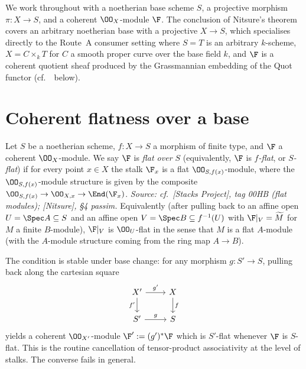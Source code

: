 We work throughout with a noetherian base scheme \(S\), a projective morphism
\(\pi : X \to S\), and a coherent \(\OO_X\)-module \(\F\). The conclusion of Nitsure's
theorem covers an arbitrary noetherian base with a projective \(X \to S\), which
specialises directly to the Route~A consumer setting where \(S = T\) is an arbitrary
\(k\)-scheme, \(X = C \times_k T\) for \(C\) a smooth proper curve over the base field
\(k\), and \(\F\) is a coherent quotient sheaf produced by the Grassmannian embedding
of the Quot functor (cf.\ \ below).

\section{Coherent flatness over a base}
\label{sec:coh_flat}

\begin{definition}

  \label{def:coherent_sheaf_flat}
  Let \(S\) be a noetherian scheme, \(f : X \to S\) a morphism of finite type, and
  \(\F\) a coherent \(\OO_X\)-module.  We say \(\F\) is \emph{flat over \(S\)}
  (equivalently, \(\F\) is \emph{\(f\)-flat}, or \emph{\(S\)-flat}) if for every
  point \(x \in X\) the stalk \(\F_x\) is a flat \(\OO_{S, f(x)}\)-module, where the
  \(\OO_{S, f(x)}\)-module structure is given by the composite
  \(\OO_{S, f(x)} \to \OO_{X, x} \to \End(\F_x)\).
  \textit{Source: cf.\ [Stacks Project], tag 00HB (flat modules); [Nitsure], \S4
  passim.}
  Equivalently (after pulling back to an affine open \(U = \Spec A \subseteq S\) and
  an affine open \(V = \Spec B \subseteq f^{-1}(U)\) with \(\F|_V = \widetilde{M}\)
  for \(M\) a finite \(B\)-module), \(\F|_V\) is \(\OO_U\)-flat in the sense that \(M\) is a
  flat \(A\)-module (with the \(A\)-module structure coming from the ring map
  \(A \to B\)).
\end{definition}

\begin{remark}
\label{rem:coh_flat_pullback}
  The condition is stable under base change: for any morphism \(g : S' \to S\),
  pulling back along the cartesian square
  \[
    \begin{tikzcd}
      X' \ar[r, "g'"] \ar[d, "f'"'] & X \ar[d, "f"] \\
      S' \ar[r, "g"]                & S
    \end{tikzcd}
  \]
  yields a coherent \(\OO_{X'}\)-module \(\F' := (g')^* \F\) which is \(S'\)-flat
  whenever \(\F\) is \(S\)-flat.  This is the routine cancellation of tensor-product
  associativity at the level of stalks. The converse fails in general.
\end{remark}


